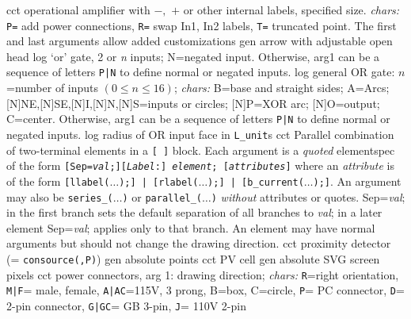   {cct}
  {operational amplifier with $-,$ $+$ or other internal labels,
    specified size. {\sl chars:} {\tt P=} add power connections,
    {\tt R=} swap In1, In2 labels,
    {\tt T=} truncated point.
    The first and last arguments allow added customizations 
   }
  {gen}
  {arrow with adjustable open head}
  {log}
  {`or' gate, 2 or {\sl n\/} inputs; N=negated input.
   Otherwise, arg1 can be a sequence of letters {\tt P|N}
   to define normal or negated inputs.
    }
  {log}
  {general OR gate: $n$=number of inputs $(0\leq n\leq 16)$;
    {\sl chars:} B=base and straight sides; A=Arcs;
           [N]NE,[N]SE,[N]I,[N]N,[N]S=inputs or circles;
           [N]P=XOR arc; [N]O=output; C=center.
   Otherwise, arg1 can be a sequence of letters {\tt P|N}
   to define normal or negated inputs.}
  {log}
  {radius of OR input face in {\tt L\_unit}s}
%
  {cct}
  { Parallel combination of two-terminal elements in a {\tt [ ]} block.
    Each argument is a {\em quoted} elementspec of the form
    {\tt[Sep={\sl val};][{\sl Label}:] {\sl element}; [{\sl attributes}]}
    where an {\sl attribute} is of the form
    {\tt[llabel($\ldots$);] | [rlabel($\ldots$);] | [b\_current($\ldots$);]}.
    An argument may also be {\tt series\_($\ldots$)} or
    {\tt parallel\_($\ldots$)} {\em without} attributes or quotes. 
    Sep={\sl val}; in the first branch sets the default
    separation of all branches to {\sl val}; in a later
    element Sep={\sl val}; applies only to that branch.
    An element may have normal arguments but should
    not change the drawing direction.
   }
  {cct}
  {proximity detector (= {\tt consource(,P)})}
  {gen}
  {absolute points}
  {cct}
  {PV cell}
  {gen}
  {absolute SVG screen pixels}
  {cct}
  {power connectors, arg 1: drawing direction; {\sl chars:}
   {\tt R}=right orientation,
   {\tt M|F}= male, female,
   {\tt A|AC}=115V, 3 prong, B=box, C=circle,
   {\tt P}= PC connector,
   {\tt D}= 2-pin connector,
   {\tt G|GC}= GB 3-pin,
   {\tt J}= 110V 2-pin
    }
